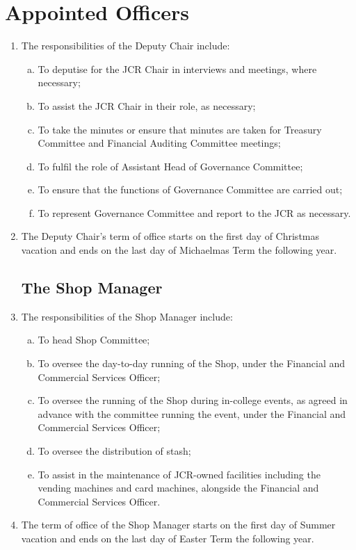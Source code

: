 \documentclass[12pt]{article}
\begin{document}
\section{Appointed Officers}
\begin{enumerate}
    \subsection{The Deputy Chair}
    \item The responsibilities of the Deputy Chair include:
    \begin{enumerate}[(a)]
        \item To deputise for the JCR Chair in interviews and meetings, where necessary;
        \item To assist the JCR Chair in their role, as necessary;
        \item To take the minutes or ensure that minutes are taken for Treasury Committee and Financial Auditing Committee meetings;
        \item To fulfil the role of Assistant Head of Governance Committee;
        \item To ensure that the functions of Governance Committee are carried out;
        \item To represent Governance Committee and report to the JCR as necessary.
    \end{enumerate}
    \item The Deputy Chair's term of office starts on the first day of Christmas vacation and ends on the last day of Michaelmas Term the following year.
    \subsection{The Shop Manager}
    \item The responsibilities of the Shop Manager include:
    \begin{enumerate}[(a)]
        \item To head Shop Committee;
        \item To oversee the day-to-day running of the Shop, under the Financial and Commercial Services Officer;
        \item To oversee the running of the Shop during in-college events, as agreed in advance with the committee running the event, under the Financial and Commercial Services Officer;
        \item To oversee the distribution of stash;
        \item To assist in the maintenance of JCR-owned facilities including the vending machines and card machines, alongside the Financial and Commercial Services Officer.
    \end{enumerate}
    \item The term of office of the Shop Manager starts on the first day of Summer vacation and ends on the last day of Easter Term the following year.

\end{enumerate}
\end{document}

